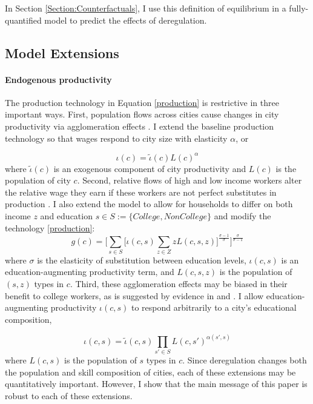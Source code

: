 \documentclass[12pt]{article}
\begin{document}
	\noindent In Section \ref{Section:Counterfactuals}, I use this definition of equilibrium in a fully-quantified model to predict the effects of deregulation.
	
	
	\subsection{Model Extensions}
	
	\paragraph*{Endogenous productivity} The production technology in Equation \eqref{production} is restrictive in three important ways. First, population flows across cities cause changes in city productivity via agglomeration effects \citep{Combes_review}. I extend the baseline production technology so that wages respond to city size with elasticity $\alpha$, or 
	
	\begin{equation}\label{endoprod}
		\iota(c) = \tilde{\iota}(c)L(c)^{\alpha}
	\end{equation}
	where $\tilde{\iota}(c)$ is an exogenous component of city productivity and $L(c)$ is the population of city $c$. Second, relative flows of high and low income workers alter the relative wage they earn if these workers are not perfect substitutes in production \citep{card}. I also extend the model to allow for households to differ on both income $z$ and education $s \in S:= \{College, NonCollege\}$ and modify the technology \eqref{production}:
	\begin{equation}\label{prod_byskill}
		g(c) = \bigg[\sum_{s \in S}\big[\iota(c, s)\sum_{z \in Z}zL(c, s, z)\big]^{\frac{\sigma - 1}{\sigma}} \bigg]^{\frac{\sigma}{\sigma - 1}}
	\end{equation}
	where $\sigma$ is the elasticity of substitution between education levels, $\iota(c, s)$ is an education-augmenting productivity term, and $L(c, s, z)$ is the population of $(s, z)$ types in $c$. Third, these agglomeration effects may be biased in their benefit to college workers, as is suggested by evidence in \cite{diamond2016} and \cite{ineqincreased}. I allow education-augmenting productivity $\iota(c, s)$ to respond arbitrarily to a city's educational composition,
	
	\begin{equation}\label{endoprod_byskill}
		\iota(c, s) = \tilde{\iota}(c, s)\prod_{s' \in S}L(c, s')^{\alpha(s', s)}
	\end{equation} where $L(c, s)$ is the population of $s$ types in $c$. Since deregulation changes both the population and skill composition of cities, each of these extensions may be quantitatively important. However, I show that the main message of this paper is robust to each of these extensions. 
	
\end{document}
